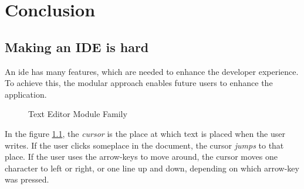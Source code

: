 \chapter{Conclusion}


\section{Making an IDE is hard}

An \gls{ide} has many features, which are needed to enhance the developer
experience. To achieve this, the modular approach enables future users to
enhance the application.

\begin{figure}
  \centering
  
  \caption{Text Editor Module Family}
  \label{fig:extendedModuleFamily}
\end{figure}

In the figure \ref{fig:extendedModuleFamily}, the \textit{cursor} is the place
at which text is placed when the user writes. If the user clicks someplace in
the document, the cursor \textit{jumps} to that place. If the user uses the
arrow-keys to move around, the cursor moves one character to left or right, or
one line up and down, depending on which arrow-key was pressed.
